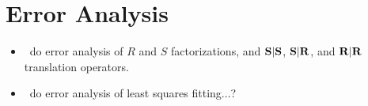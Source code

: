 \section{Error Analysis}

\begin{itemize}
\item \TODO\ do error analysis of $R$ and $S$ factorizations, and $\bold{S}|\bold{S}$,
$\bold{S}|\bold{R}$, and $\bold{R}|\bold{R}$ translation operators.
\item \TODO\ do error analysis of least squares fitting...?
\end{itemize}

